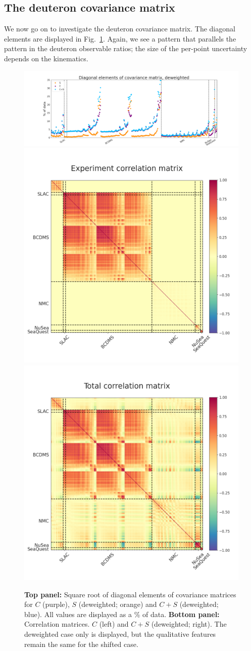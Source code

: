 \subsection{The deuteron covariance matrix}
We now go on to investigate the deuteron covariance matrix. The diagonal elements are displayed in Fig.~\ref{fig:deutcov}. Again, we see a pattern that parallels the pattern in the deuteron observable ratios; the size of the per-point uncertainty depends on the kinematics. 
\begin{figure}[H]
  \begin{center}
      \includegraphics[width=\linewidth, trim={4cm 0 4cm 0}]{nuclear/plots/diag_covmat_updated.png}
    \includegraphics[width=0.45\linewidth]{nuclear/plots/expcov_updated.png}
        \includegraphics[width=0.45\linewidth]{nuclear/plots/totcov_updated.png}
    \caption{\textbf{Top panel:} Square root of diagonal elements of covariance matrices for $C$ (purple), $S$ (deweighted; orange) and $C+S$ (deweighted; blue). All values are displayed as a \% of data. \textbf{Bottom panel: }Correlation matrices. $C$ (left) and $C+S$ (deweighted; right). The deweighted case only is displayed, but the qualitative features remain the same for the shifted case.
    \label{fig:deutcov} }
    \end{center}
\end{figure}   
